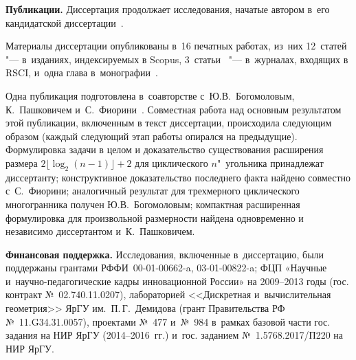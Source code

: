 \textbf{Публикации.}
Диссертация продолжает исследования, начатые автором в~его кандидатской диссертации~.

Материалы диссертации опубликованы в~16 печатных работах, из~них 
12~статей~ "--- в~изданиях, индексируемых в Scopus,
3~статьи~ "--- в~журналах, входящих в RSCI, и~одна глава в~монографии~.

Одна публикация подготовлена в~соавторстве с~Ю.В.~Богомоловым, К.~Пашковичем и~С.~Фиорини~. Совместная работа над основным результатом этой публикации, включенным в текст диссертации, происходила следующим образом (каждый следующий этап работы опирался на предыдущие). Формулировка задачи в целом и доказательство существования расширения размера $2 \lfloor\log_2 (n-1)\rfloor + 2$ для циклического $n$"~угольника принадлежат диссертанту; конструктивное доказательство последнего факта найдено совместно с~С.~Фиорини; аналогичный результат для трехмерного циклического многогранника получен Ю.В.~Богомоловым; компактная расширенная формулировка для произвольной размерности найдена одновременно и независимо диссертантом и~К.~Пашковичем. 


\textbf{Финансовая поддержка.}
Исследования, включенные в~диссертацию, были поддержаны грантами РФФИ~00-01-00662-a, 03-01-00822-a; 
ФЦП «Научные и~научно-педагогические кадры инновационной России» на 2009--2013 годы (гос. контракт №~02.740.11.0207),
лабораторией <<Дискретная и~вычислительная геометрия>> ЯрГУ им.~П.\,Г.~Демидова
(грант Правительства РФ №~11.G34.31.0057),
проектами №~477 и~№~984 в~рамках базовой части гос. задания на НИР ЯрГУ (2014--2016~гг.) и~гос. заданием №~1.5768.2017/П220 на НИР ЯрГУ.



